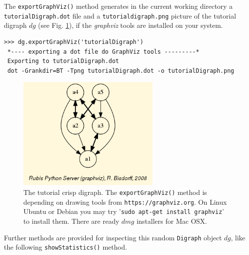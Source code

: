 The \texttt{exportGraphViz()} method generates in the current working directory a \texttt{tutorialDigraph.dot} file and a \texttt{tutorialdigraph.png} picture of the tutorial digraph $dg$ (see Fig. \ref{fig:1.1}), if the \emph{graphviz} tools are installed on your system.
\begin{lstlisting}
>>> dg.exportGraphViz('tutorialDigraph')
 *---- exporting a dot file do GraphViz tools ---------*
 Exporting to tutorialDigraph.dot
 dot -Grankdir=BT -Tpng tutorialDigraph.dot -o tutorialDigraph.png
\end{lstlisting}
\begin{figure}[h]
\sidecaption
\includegraphics[width=7cm]{Figures/tutorialDigraph.png}
\caption{The tutorial crisp digraph. The \texttt{exportGraphViz()} method is depending on drawing tools from \texttt{https://graphviz.org}. On Linux Ubuntu or Debian you may try '\texttt{sudo apt-get install graphviz}’ to install them. There are ready $dmg$ installers for Mac OSX.}
\label{fig:1.1}       %
\end{figure}

Further methods are provided for inspecting this random \texttt{Digraph} object $dg$, like the following \texttt{showStatistics()} method.


